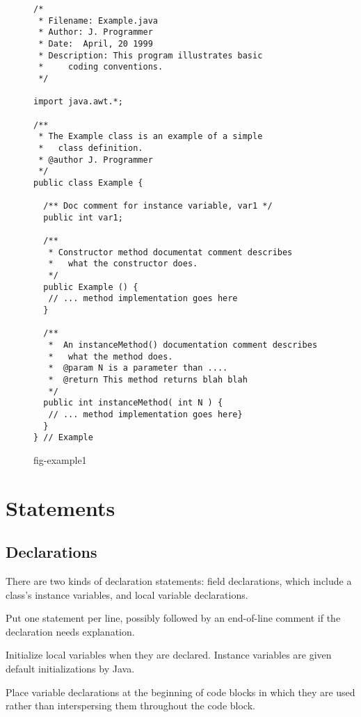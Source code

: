 \begin{figure}[tbhp]
\jjjprogstart
\begin{jjjlisting}
\begin{lstlisting}
/*
 * Filename: Example.java
 * Author: J. Programmer
 * Date:  April, 20 1999
 * Description: This program illustrates basic 
 *     coding conventions.
 */

import java.awt.*;

/**
 * The Example class is an example of a simple 
 *   class definition.
 * @author J. Programmer
 */
public class Example {

  /** Doc comment for instance variable, var1 */
  public int var1;

  /**
   * Constructor method documentat comment describes
   *   what the constructor does.
   */
  public Example () {
   // ... method implementation goes here
  }

  /**
   *  An instanceMethod() documentation comment describes
   *   what the method does.
   *  @param N is a parameter than ....
   *  @return This method returns blah blah
   */
  public int instanceMethod( int N ) {
   // ... method implementation goes here}
  }
} // Example
\end{lstlisting}
\end{jjjlisting}
{fig-example1}
\end{figure}


\section*{Statements}
\label{statements}
\subsection*{Declarations}
\noindent There are two kinds of declaration statements: field declarations,
which include a class's instance variables, and local variable
declarations.

\begin{BL}
\item  Put one statement per line, possibly followed by an
end-of-line comment if the declaration needs explanation.

\item  Initialize local variables when they are declared.  Instance
variables are given default initializations by Java.

\item  Place variable declarations at the beginning of code blocks in which
they are used rather than interspersing them throughout the code
block.
\end{BL}




